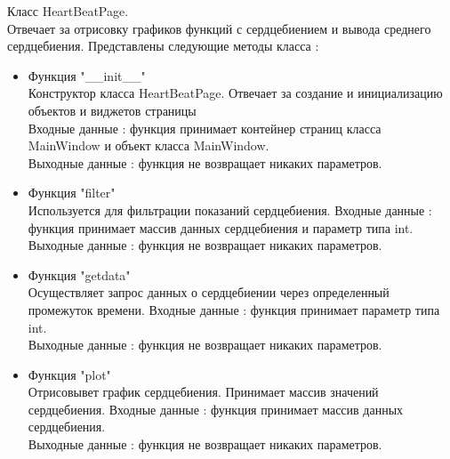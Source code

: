 \documentclass[a4document]{article}
\begin{document}
{\begin{itemize}
        \newpage
        Класс HeartBeatPage.\\
        Отвечает за отрисовку графиков функций с сердцебиением и вывода среднего сердцебиения.
        Представлены следующие методы класса :
        \begin{itemize}
            \item Функция "\_\_init\_\_" \\
                Конструктор класса HeartBeatPage. Отвечает за создание и инициализацию объектов и виджетов страницы \\
                Входные данные : функция принимает контейнер страниц класса \\MainWindow и объект класса MainWindow.\\
                Выходные данные : функция не возвращает никаких параметров.
            \item Функция "filter" \\
                Используется для фильтрации показаний сердцебиения.
                Входные данные : функция принимает массив данных сердцебиения и параметр типа int.\\
                Выходные данные : функция не возвращает никаких параметров.
            \item Функция "getdata" \\
                Осуществляет запрос данных о сердцебиении через определенный промежуток времени.
                Входные данные : функция принимает параметр типа int.\\
                Выходные данные : функция не возвращает никаких параметров.
            \item Функция "plot" \\
                Отрисовывет график сердцебиения. Принимает массив значений сердцебиения.
                Входные данные : функция принимает массив данных сердцебиения.\\
                Выходные данные : функция не возвращает никаких параметров.
        \end{itemize}
        

\end{itemize}}
\end{document}
